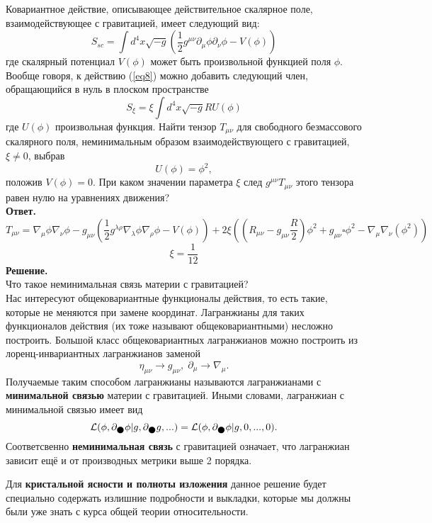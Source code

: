 \documentclass[12pt]{article}
\theoremstyle{definition}
\begin{document}
\begin{enumerate}
Ковариантное действие, описывающее действительное скалярное поле, взаимодействующее с гравитацией, имеет следующий вид:
    \begin{equation}\label{eq8}
            S_{sc}=\int d^4x\sqrt{-g}\left(\frac{1}{2}g^{\mu\nu}\partial_\mu\phi\partial_\nu\phi-V(\phi)\right)
    \end{equation}
    где скалярный потенциал $V(\phi)$ может быть произвольной функцией поля $\phi$. Вообще говоря, к действию (\ref{eq8}) можно добавить следующий член, обращающийся в нуль в плоском пространстве $$ S_{\xi} = \xi \int d^4x\sqrt{-g} R U(\phi)$$ где $U(\phi)$ произвольная функция. Найти тензор $T_{\mu\nu}$ для свободного безмассового скалярного поля, неминимальным образом взаимодействующего с гравитацией, $\xi \neq 0$, выбрав $$U(\phi) = \phi^2,$$ положив $V(\phi) = 0.$ При каком значении параметра $\xi$ след $g^{\mu\nu}T_{\mu\nu}$ этого тензора равен нулю на уравнениях движения?\\
     \textbf{Ответ.}
     \begin{equation*}
     \boxed{T_{\mu\nu}=\nabla_\mu\phi\nabla_\nu\phi-g_{\mu\nu}\left(\frac{1}{2}g^{\lambda\rho}\nabla_\lambda\phi\nabla_\rho\phi - V(\phi)\right)+2\xi\left(\left(R_{\mu\nu}-g_{\mu\nu}\frac{R}{2}\right)\phi^2+g_{\mu\nu} \square \phi^2-\nabla_{\mu}\nabla_{\nu}(\phi^2)\right)}
     \end{equation*}
     \begin{equation}
        \boxed{\xi=\frac{1}{12}}
     \end{equation}
     \textbf{Решение.}\\
Что такое неминимальная связь материи с гравитацией?\\
Нас интересуют общековариантные функционалы действия, то есть такие, которые не меняются при замене координат. Лагранжианы для таких функционалов действия (их тоже называют общековариантными) несложно построить. Большой класс общековариантных лагранжианов можно построить из лоренц-инвариантных лагранжианов заменой $$\eta_{\mu\nu}\rightarrow g_{\mu\nu},\;\partial_{\mu}\rightarrow\nabla_{\mu}.$$ Получаемые таким способом лагранжианы называются лагранжианами с \textbf{минимальной связью} материи с гравитацией. Иными словами, лагранжиан с минимальной связью имеет вид $$\mathcal{L}(\phi,\partial_{\newmoon}\phi|g,\partial_{\newmoon}g,...)=\mathcal{L}(\phi,\partial_{\newmoon}\phi|g,0,...,0).$$ Соответсвенно \textbf{неминимальная связь} с гравитацией означает, что лагранжиан зависит ещё и от производных метрики выше 2 порядка.

Для \textbf{кристальной ясности и полноты изложения} данное решение будет специально содержать излишние подробности и выкладки, которые мы должны были уже знать с курса общей теории относительности.  


\end{enumerate}
\end{document}
